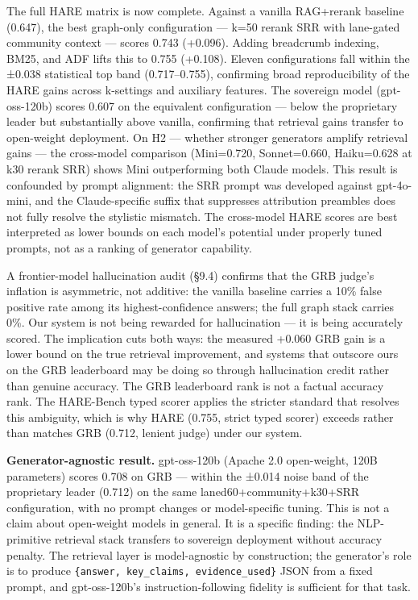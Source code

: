 \documentclass[
]{article}
\begin{document}
The full HARE matrix is now complete. Against a vanilla RAG+rerank
baseline (0.647), the best graph-only configuration --- k=50 rerank SRR
with lane-gated community context --- scores 0.743 (+0.096). Adding
breadcrumb indexing, BM25, and ADF lifts this to 0.755 (+0.108). Eleven
configurations fall within the ±0.038 statistical top band
(0.717--0.755), confirming broad reproducibility of the HARE gains
across k-settings and auxiliary features. The sovereign model
(gpt-oss-120b) scores 0.607 on the equivalent configuration --- below
the proprietary leader but substantially above vanilla, confirming that
retrieval gains transfer to open-weight deployment. On H2 --- whether
stronger generators amplify retrieval gains --- the cross-model
comparison (Mini=0.720, Sonnet=0.660, Haiku=0.628 at k30 rerank SRR)
shows Mini outperforming both Claude models. This result is confounded
by prompt alignment: the SRR prompt was developed against gpt-4o-mini,
and the Claude-specific suffix that suppresses attribution preambles
does not fully resolve the stylistic mismatch. The cross-model HARE
scores are best interpreted as lower bounds on each model's potential
under properly tuned prompts, not as a ranking of generator capability.

A frontier-model hallucination audit (§9.4) confirms that the GRB
judge's inflation is asymmetric, not additive: the vanilla baseline
carries a 10\% false positive rate among its highest-confidence answers;
the full graph stack carries 0\%. Our system is not being rewarded for
hallucination --- it is being accurately scored. The implication cuts
both ways: the measured +0.060 GRB gain is a lower bound on the true
retrieval improvement, and systems that outscore ours on the GRB
leaderboard may be doing so through hallucination credit rather than
genuine accuracy. The GRB leaderboard rank is not a factual accuracy
rank. The HARE-Bench typed scorer applies the stricter standard that
resolves this ambiguity, which is why HARE (0.755, strict typed scorer)
exceeds rather than matches GRB (0.712, lenient judge) under our system.

\textbf{Generator-agnostic result.} gpt-oss-120b (Apache 2.0
open-weight, 120B parameters) scores 0.708 on GRB --- within the ±0.014
noise band of the proprietary leader (0.712) on the same
laned60+community+k30+SRR configuration, with no prompt changes or
model-specific tuning. This is not a claim about open-weight models in
general. It is a specific finding: the NLP-primitive retrieval stack
transfers to sovereign deployment without accuracy penalty. The
retrieval layer is model-agnostic by construction; the generator's role
is to produce \texttt{\{answer,\ key\_claims,\ evidence\_used\}} JSON
from a fixed prompt, and gpt-oss-120b's instruction-following fidelity
is sufficient for that task.
\end{document}
